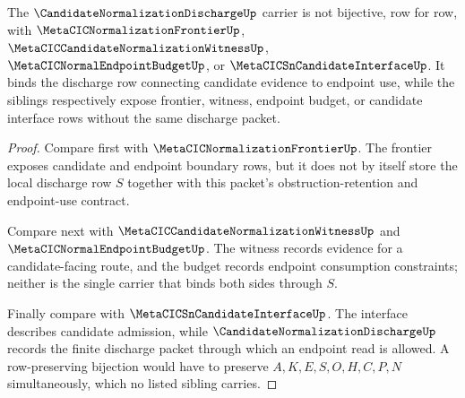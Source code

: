 \begin{theorem}
\label{thm:candidate-normalization-discharge-sibling-separation}
The $\CandidateNormalizationDischargeUp$ carrier is not bijective, row for row, with $\MetaCICNormalizationFrontierUp$, $\MetaCICCandidateNormalizationWitnessUp$, $\MetaCICNormalEndpointBudgetUp$, or $\MetaCICSnCandidateInterfaceUp$. It binds the discharge row connecting candidate evidence to endpoint use, while the siblings respectively expose frontier, witness, endpoint budget, or candidate interface rows without the same discharge packet.
\end{theorem}
\begin{proof}
Compare first with $\MetaCICNormalizationFrontierUp$. The frontier exposes candidate and endpoint boundary rows, but it does not by itself store the local discharge row $S$ together with this packet's obstruction-retention and endpoint-use contract.

Compare next with $\MetaCICCandidateNormalizationWitnessUp$ and $\MetaCICNormalEndpointBudgetUp$. The witness records evidence for a candidate-facing route, and the budget records endpoint consumption constraints; neither is the single carrier that binds both sides through $S$.

Finally compare with $\MetaCICSnCandidateInterfaceUp$. The interface describes candidate admission, while $\CandidateNormalizationDischargeUp$ records the finite discharge packet through which an endpoint read is allowed. A row-preserving bijection would have to preserve $A,K,E,S,O,H,C,P,N$ simultaneously, which no listed sibling carries.
\end{proof}



